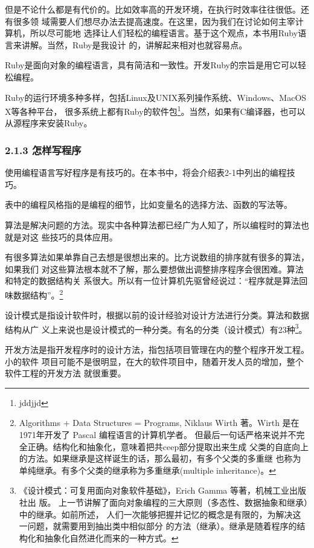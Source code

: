 \documentclass[color=cyan,mathpazo,titlestyle=hang]{elegantbook}
\begin{document}
但是不论什么都是有代价的。比如效率高的开发环境，在执行时效率往往很低。还有很多领
域需要人们想尽办法去提高速度。在这里，因为我们在讨论如何主宰计算机，所以尽可能地
选择让人们轻松的编程语言。基于这个观点，本书用Ruby语言来讲解。当然，Ruby是我设计
的，讲解起来相对也就容易点。

Ruby是面向对象的编程语言，具有简洁和一致性。开发Ruby的宗旨是用它可以轻松编程。


Ruby的运行环境多种多样，包括Linux及UNIX系列操作系统、Windows、MacOS X等各种平台，
很多系统上都有Ruby的软件包\footnote{jddjjd}。当然，如果有C编译器，也可以从源程序来安装Ruby。

\subsubsection{2.1.3 怎样写程序}
\label{sec:orgd9a448d}

使用编程语言写好程序是有技巧的。在本书中，将会介绍表2-1中列出的编程技巧。

表中的编程风格指的是编程的细节，比如变量名的选择方法、函数的写法等。

算法是解决问题的方法。现实中各种算法都已经广为人知了，所以编程时的算法也就是对这
些技巧的具体应用。

有很多算法如果单靠自己去想是很想出来的。比方说数组的排序就有很多的算法，如果我们
对这些算法根本就不了解，那么要想做出调整排序程序会很困难。算法和特定的数据结构关
系很大。所以有一位计算机先驱曾经说过：“程序就是算法回味数据结构”。\footnote{Algorithms + Data Structures = Programs, Niklaus Wirth 著。Wirth 是在
  1971年开发了 Pascal 编程语言的计算机学者。
  但最后一句话严格来说并不完全正确。结构化和抽象化，意味着把共ceep部分提取出来生成
  父类的自底向上的方法。如果继承是这样诞生的话，那么最初，有多个父类的多重继
  也称为单纯继承。有多个父类的继承称为多重继承(multiple inheritance)。}

设计模式是指设计软件时，根据以前的设计经验对设计方法进行分类。算法和数据结构从广
义上来说也是设计模式的一种分类。有名的分类（设计模式）有23种\footnote{《设计模式：可复用面向对象软件基础》，Erich Gamma 等著，机械工业出版社出
  版。
  上一节讲解了面向对象编程的三大原则（多态性、数据抽象和继承）中的继承。如前所述，
  人们一次能够把握并记忆的概念是有限的，为解决这一问题，就需要用到抽出类中相似部分
  的方法（继承）。继承是随着程序的结构化和抽象化自然进化而来的一种方式。}。

开发方法是指开发程序时的设计方法，指包括项目管理在内的整个程序开发工程。小的软件
项目可能不是很明显，在大的软件项目中，随着开发人员的增加，整个软件工程的开发方法
就很重要。
\end{document}
